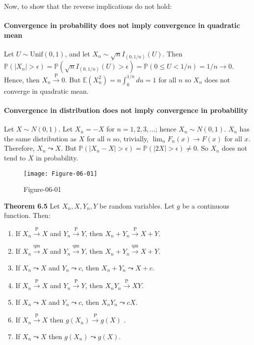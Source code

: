 Now, to show that the reverse implications do not hold:

\paragraph{Convergence in probability does not imply convergence in
quadratic
mean}\label{convergence-in-probability-does-not-imply-convergence-in-quadratic-mean}

Let \(U \sim \text{Unif}(0, 1)\), and let
\(X_{n} \sim \sqrt{n} I_{(0, 1 / n)}(U)\). Then
\(\mathbb{P}(|X_{n}| > \epsilon) = \mathbb{P}(\sqrt{n} I_{(0, 1 / n)}(U) > \epsilon) = \mathbb{P}(0 \leq U < 1/n) = 1/n \rightarrow 0\).
Hence, then \(X_{n} \xrightarrow{\text{P}} 0\). But
\(\mathbb{E}(X_{n}^{2}) = n \int_{0}^{1/n} du = 1\) for all \(n\) so \(X_{n}\)
does not converge in quadratic mean.

\paragraph{Convergence in distribution does not imply convergence in
probability}\label{convergence-in-distribution-does-not-imply-convergence-in-probability}

Let \(X \sim N(0, 1)\). Let \(X_{n} = -X\) for \(n = 1, 2, 3, \dots\);
hence \(X_{n} \sim N(0, 1)\). \(X_{n}\) has the same distribution as \(X\)
for all \(n\) so, trivially, \(\lim _{n} F_{n}(x) \rightarrow F(x)\) for all
\(x\). Therefore, \(X_{n} \leadsto X\). But
\(\mathbb{P}(|X_{n} - X| > \epsilon) = \mathbb{P}(|2X| > \epsilon) \neq 0\).
So \(X_{n}\) does not tend to \(X\) in probability.

\begin{figure}[H]
\centering
\texttt{[image: Figure-06-01]}
\caption{Figure-06-01}
\end{figure}

\textbf{Theorem 6.5} Let \(X_{n}, X, Y_{n}, Y\) be random variables. Let
\(g\) be a continuous function. Then:

\begin{enumerate}[tightlist,label={\arabic*.}]
\item
  If \(X_{n} \xrightarrow{\text{P}} X\) and
  \(Y_{n} \xrightarrow{\text{P}} Y\), then
  \(X_{n} + Y_{n} \xrightarrow{\text{P}} X + Y\).
\item
  If \(X_{n} \xrightarrow{\text{qm}} X\) and
  \(Y_{n} \xrightarrow{\text{qm}} Y\), then
  \(X_{n} + Y_{n} \xrightarrow{\text{qm}} X + Y\).
\item
  If \(X_{n} \leadsto X\) and \(Y_{n} \leadsto c\), then
  \(X_{n} + Y_{n} \leadsto X + c\).
\item
  If \(X_{n} \xrightarrow{\text{P}} X\) and
  \(Y_{n} \xrightarrow{\text{P}} Y\), then
  \(X_{n} Y_{n} \xrightarrow{\text{P}} XY\).
\item
  If \(X_{n} \leadsto X\) and \(Y_{n} \leadsto c\), then
  \(X_{n} Y_{n} \leadsto cX\).
\item
  If \(X_{n} \xrightarrow{\text{P}} X\) then
  \(g(X_{n}) \xrightarrow{\text{P}} g(X)\) .
\item
  If \(X_{n} \leadsto X\) then \(g(X_{n}) \leadsto g(X)\).
\end{enumerate}

